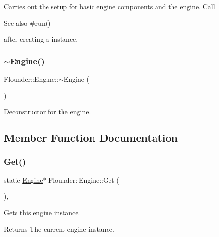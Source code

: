 Carries out the setup for basic engine components and the engine. Call \begin{DoxySeeAlso}{See also}
\#run()


\end{DoxySeeAlso}
after creating a instance. 

\mbox{\label{class_flounder_1_1_engine_abb8f83d5ed5345f6cb262a0ac5a3e24c}} 
\subsubsection{\texorpdfstring{$\sim$\+Engine()}{~Engine()}}
{\footnotesize\ttfamily Flounder\+::\+Engine\+::$\sim$\+Engine (\begin{DoxyParamCaption}{ }\end{DoxyParamCaption})}



Deconstructor for the engine. 



\subsection{Member Function Documentation}
\mbox{\label{class_flounder_1_1_engine_a544bad93d45c4c55411716a125065c7b}} 
\subsubsection{\texorpdfstring{Get()}{Get()}}
{\footnotesize\ttfamily static \hyperlink{class_flounder_1_1_engine}{Engine}$\ast$ Flounder\+::\+Engine\+::\+Get (\begin{DoxyParamCaption}{ }\end{DoxyParamCaption})\hspace{0.3cm}{\ttfamily [inline]}, {\ttfamily [static]}}



Gets this engine instance. 

\begin{DoxyReturn}{Returns}
The current engine instance. 
\end{DoxyReturn}
\mbox{\label{class_flounder_1_1_engine_ac5876a0b6a65eb8fed37c9d04f4573d2}} 
